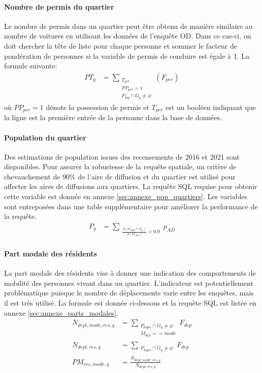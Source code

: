             \paragraph{Nombre de permis du quartier} Le nombre de permis dans un quartier peut être obtenu de manière similaire au nombre de voitures en utilisant les données de l'enquête OD. Dans ce cas-ci, on doit chercher la tête de liste pour chaque personne et sommer le facteur de pondération de personnes si la variable de permis de conduire est égale à 1. La formule suivante:
            \begin{align}
                PT_{q} &= \sum_{\substack{T_{per}\\ PP_{per}=1  \\ P_{log}\cap G_q\neq\varnothing}}{\left(F_{per}\right)} \label{eq:perm}
            \end{align}
            où $PP_{per}=1$ dénote la possession de permis et $T_{per}$ est un booléen indiquant que la ligne est la première entrée de la personne dans la base de données. 
            \paragraph{Population du quartier} Des estimations de population issues des recensements de 2016 et 2021 sont disponibles. Pour assurer la robustesse de la requête spatiale, un critère de chevauchement de 90\% de l'aire de diffusion et du quartier est utilisé pour affecter les aires de diffusions aux quartiers. La requête SQL requise pour obtenir cette variable est donnée en annexe \ref{sec:annexe_pop_quartiers}. Les variables sont entreposées dans une table supplémentaire pour améliorer la performance de la requête.
            \begin{align}
                P_{q}&= \sum_{\substack{\frac{A\left(G_{AD}\cap G_q\right)}{A\left(G_{AD}\right)}>0.9}}{p_{AD}} \label{eq:popu}
            \end{align}
            \paragraph{Part modale des résidents} La part modale des résidents vise à donner une indication des comportements de mobilité des personnes vivant dans un quartier. L'indicateur est potentiellement problématique puisque le nombre de déplacements varie entre les enquêtes, mais il est très utilisé. La formule est donnée ci-dessous et la requête SQL est listée en annexe \ref{sec:annexe_parts_modales}.
            \begin{align}
                N_{depl,mode,res,q}  &= \sum_{\substack{ P_{logis} \cap G_q\neq\varnothing \\ M_{dep} == mode}}{F_{dep}} \\
                N_{depl,res,q} &= \sum_{\substack{P_{logis} \cap G_q\neq\varnothing}}{F_{dep}} \\
                PM_{res,mode,q} &= \frac{N_{depl,mode,res,q}}{N_{depl,res,q}} \label{eq:pm-res}
            \end{align}
